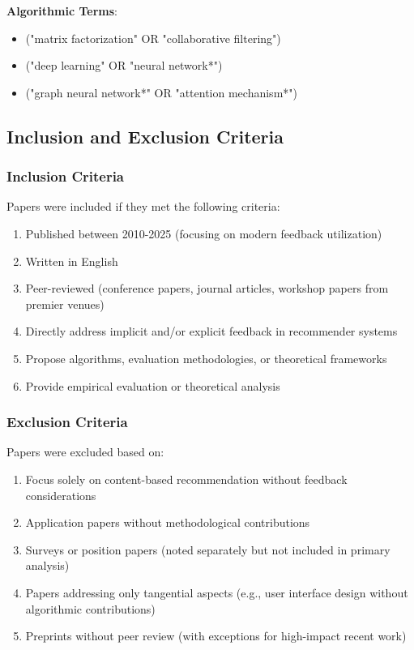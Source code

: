 \textbf{Algorithmic Terms}:
\begin{itemize}
    \item ("matrix factorization" OR "collaborative filtering")
    \item ("deep learning" OR "neural network*")
    \item ("graph neural network*" OR "attention mechanism*")
\end{itemize}

\subsection{Inclusion and Exclusion Criteria}

\subsubsection{Inclusion Criteria}
Papers were included if they met the following criteria:
\begin{enumerate}
    \item Published between 2010-2025 (focusing on modern feedback utilization)
    \item Written in English
    \item Peer-reviewed (conference papers, journal articles, workshop papers from premier venues)
    \item Directly address implicit and/or explicit feedback in recommender systems
    \item Propose algorithms, evaluation methodologies, or theoretical frameworks
    \item Provide empirical evaluation or theoretical analysis
\end{enumerate}

\subsubsection{Exclusion Criteria}
Papers were excluded based on:
\begin{enumerate}
    \item Focus solely on content-based recommendation without feedback considerations
    \item Application papers without methodological contributions
    \item Surveys or position papers (noted separately but not included in primary analysis)
    \item Papers addressing only tangential aspects (e.g., user interface design without algorithmic contributions)
    \item Preprints without peer review (with exceptions for high-impact recent work)
\end{enumerate}

